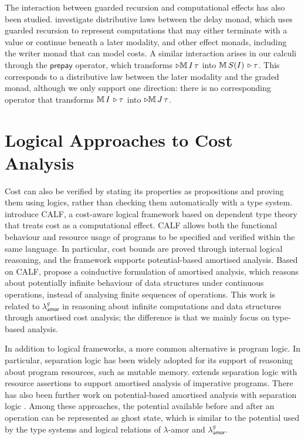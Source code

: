 The interaction between guarded recursion and computational effects has also been studied. 
\cite{mogelbergWhatMonadsCan2025} investigate distributive laws between the delay monad,
which uses guarded recursion to represent computations that may either terminate with a value or continue beneath a later modality,
and other effect monads, including the writer monad that can model costs.
A similar interaction arises in our calculi through the $\mathsf{prepay}$ operator, 
which transforms $\triangleright\mathbb{M}\,{I}\, \tau$ into $\mathbb{M}\,{S(I)}\, \triangleright\tau$. 
This corresponds to a distributive law between the later modality and the graded monad, although we only support one direction: there is no corresponding operator that transforms $\mathbb{M}\,{I}\, \triangleright\tau$ into $\triangleright\mathbb{M}\,{J}\, \tau$.

\section{Logical Approaches to Cost Analysis}
\label{sec:rw-logics}
Cost can also be verified by stating its properties as propositions and proving
them using logics, rather than checking them automatically with a type system.
\cite{niuCostawareLogicalFramework2022a} introduce CALF, 
a cost-aware logical framework based on dependent type theory that treats cost as a computational effect. 
CALF allows both the functional behaviour and resource usage of programs to be specified and verified within the same language. 
In particular, cost bounds are proved through internal logical reasoning, and the framework supports potential-based amortised analysis.
Based on CALF, \cite{grodinAmortizedAnalysisCoinduction2023a} propose a coinductive formulation of amortised analysis, 
which reasons about potentially infinite behaviour of data structures under continuous operations, instead of analysing finite sequences of operations. 
This work is related to $\lambda^g_{\mathsf{amor}}$ in reasoning about infinite computations and data structures through amortised cost analysis; the difference is that we mainly focus on type-based analysis.

In addition to logical frameworks, a more common alternative is program logic.
In particular, separation logic \citep{Reynolds02} has been widely adopted for its support of reasoning about program resources, such as mutable memory.
\cite{Atkey10} extends separation logic with resource assertions to support amortised analysis of imperative programs. There has also been further work on potential-based amortised analysis with separation logic \citep{ChargueraudP19, MevelJP19}.
Among these approaches, the potential available before and after an operation can be represented as ghost state, which is similar to 
the potential used by the type systems and logical relations of $\lambda$-amor and $\lambda^g_{\mathsf{amor}}$.

